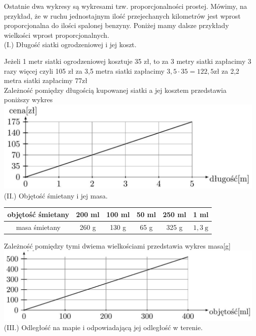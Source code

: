 \documentclass[10pt]{article}
\begin{document}
Ostatnie dwa wykresy są wykresami tzw. proporcjonalności prostej. Mówimy, na przykład, że w ruchu jednostajnym ilość przejechanych kilometrów jest wprost proporcjonalna do ilości spalonej benzyny. Poniżej mamy dalsze przykłady wielkości wprost proporcjonalnych.\\
(I.) Długość siatki ogrodzeniowej i jej koszt.

Jeżeli 1 metr siatki ogrodzeniowej kosztuje 35 zł, to za 3 metry siatki zapłacimy 3 razy więcej czyli 105 zł za 3,5 metra siatki zapłacimy \(3,5 \cdot 35=122,5 \mathrm{zł}\) za 2,2 metra siatki zapłacimy \(77 \mathrm{zł}\)\\
Zależność pomiędzy długością kupowanej siatki a jej kosztem przedstawia poniższy wykres\\
\includegraphics[max width=\textwidth, center]{2024_11_21_8f01584889ff06348ae7g-075(1)}\\
(II.) Objętość śmietany i jej masa.

\begin{center}
\begin{tabular}{c|c|c|c|c|c}
objętość śmietany & 200 ml & 100 ml & 50 ml & 250 ml & 1 ml \\
\hline
masa śmietany & 260 g & 130 g & 65 g & 325 g & \(1,3 \mathrm{~g}\) \\
\hline
\end{tabular}
\end{center}

Zależność pomiędzy tymi dwiema wielkościami przedstawia wykres masa[g]\\
\includegraphics[max width=\textwidth, center]{2024_11_21_8f01584889ff06348ae7g-075}\\
(III.) Odległość na mapie i odpowiadającą jej odległość w terenie.
\end{document}
